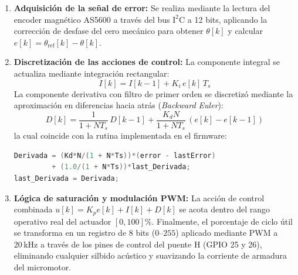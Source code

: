 \begin{enumerate}
  \item \textbf{Adquisición de la señal de error:} Se realiza mediante la lectura del encoder magnético AS5600 a través del bus $\mathrm{I^2C}$ a 12 bits, aplicando la corrección de desfase del cero mecánico para obtener $\theta[k]$ y calcular $e[k] = \theta_{\mathrm{ref}}[k] - \theta[k]$.

  \item \textbf{Discretización de las acciones de control:}
  La componente integral se actualiza mediante integración rectangular:
  \begin{equation}
    I[k] = I[k-1] + K_i\,e[k]\,T_s
  \end{equation}
  La componente derivativa con filtro de primer orden se discretizó mediante la aproximación en diferencias hacia atrás (\textit{Backward Euler}):
  \begin{equation}
    D[k] = \frac{1}{1 + N T_s}\,D[k-1] + \frac{K_d N}{1 + N T_s}\,(e[k] - e[k-1])
  \end{equation}
  la cual coincide con la rutina implementada en el firmware:
  \begin{lstlisting}[language=C++]
Derivada = (Kd*N/(1 + N*Ts))*(error - lastError) 
         + (1.0/(1 + N*Ts))*last_Derivada;
last_Derivada = Derivada;
  \end{lstlisting}

  \item \textbf{Lógica de saturación y modulación PWM:}
  La acción de control combinada $u[k] = K_p e[k] + I[k] + D[k]$ se acota dentro del rango operativo real del actuador $[0, 100]\%$. Finalmente, el porcentaje de ciclo útil se transforma en un registro de 8 bits ($0\text{--}255$) aplicado mediante PWM a $20\,\mathrm{kHz}$ a través de los pines de control del puente H (GPIO 25 y 26), eliminando cualquier silbido acústico y suavizando la corriente de armadura del micromotor.
\end{enumerate}
